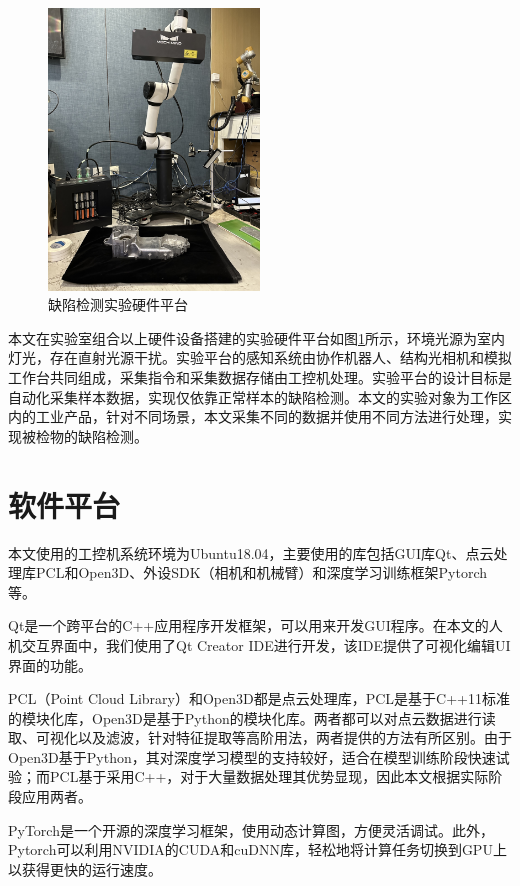 \begin{figure}[htbp]
  \centering
  \includegraphics[width=0.5\textwidth,angle=270]{figures/2/hw-platform.jpeg}
  \caption{缺陷检测实验硬件平台}\label{fig:hw-platform}
\end{figure}
本文在实验室组合以上硬件设备搭建的实验硬件平台如图\ref{fig:hw-platform}所示，环境光源为室内灯光，存在直射光源干扰。实验平台的感知系统由协作机器人、结构光相机和模拟工作台共同组成，采集指令和采集数据存储由工控机处理。实验平台的设计目标是自动化采集样本数据，实现仅依靠正常样本的缺陷检测。本文的实验对象为工作区内的工业产品，针对不同场景，本文采集不同的数据并使用不同方法进行处理，实现被检物的缺陷检测。


\section{软件平台}
本文使用的工控机系统环境为Ubuntu18.04，主要使用的库包括GUI库Qt、点云处理库PCL和Open3D、外设SDK（相机和机械臂）和深度学习训练框架Pytorch等。

Qt是一个跨平台的C++应用程序开发框架，可以用来开发GUI程序。在本文的人机交互界面中，我们使用了Qt Creator IDE进行开发，该IDE提供了可视化编辑UI界面的功能。

PCL（Point Cloud Library）和Open3D都是点云处理库，PCL是基于C++11标准的模块化库，Open3D是基于Python的模块化库。两者都可以对点云数据进行读取、可视化以及滤波，针对特征提取等高阶用法，两者提供的方法有所区别。由于Open3D基于Python，其对深度学习模型的支持较好，适合在模型训练阶段快速试验；而PCL基于采用C++，对于大量数据处理其优势显现，因此本文根据实际阶段应用两者。

PyTorch是一个开源的深度学习框架，使用动态计算图，方便灵活调试。此外，Pytorch可以利用NVIDIA的CUDA和cuDNN库，轻松地将计算任务切换到GPU上以获得更快的运行速度。


